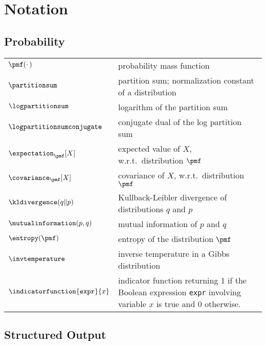 \chapter{Notation}


\section*{Probability}

\begin{tabularx}{\textwidth}{lX}
	\toprule
	\tableheadline{Symbol} &		\tableheadline{Meaning} \\
	\midrule
	$\pmf(\cdotp)$ &                probability mass function \\
	$\partitionsum$ &               partition sum; normalization constant of a distribution\\
    $\logpartitionsum$ &            logarithm of the partition sum\\
    $\logpartitionsumconjugate$ &   conjugate dual of the log partition sum\\
	$\expectation_{\pmf}[X]$ &      expected value of $X$,
                                    w.r.t.\ distribution $\pmf$\\
    $\covariance_{\pmf}[X]$ &       covariance of $X$, w.r.t.\ distribution $\pmf$\\
	$\kldivergence(q \| p)$ &		Kullback-Leibler divergence of distributions $q$ and $p$\\
    $\mutualinformation(p,q)$ &     mutual information of $p$ and $q$\\
    $\entropy(\pmf)$ &              entropy of the distribution $\pmf$\\
    $\invtemperature$ &             inverse temperature in a Gibbs distribution\\
    $\indicatorfunction{\texttt{expr}}{x}$ &    indicator function returning 1
    if the Boolean expression \texttt{expr} involving variable $x$ is true and
    0 otherwise.\\
	\bottomrule
\end{tabularx}

\vfill


\section*{Structured Output}

